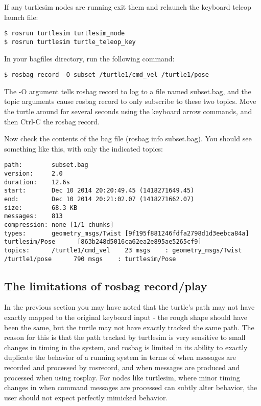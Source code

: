 If any turtlesim nodes are running exit them and relaunch the keyboard teleop launch file:

\begin{lstlisting}[breaklines=true languages=bash]
$ rosrun turtlesim turtlesim_node
$ rosrun turtlesim turtle_teleop_key
\end{lstlisting}

In your bagfiles directory, run the following command:

\begin{lstlisting}[breaklines=true languages=bash]
$ rosbag record -O subset /turtle1/cmd_vel /turtle1/pose
\end{lstlisting}

The -O argument tells rosbag record to log to a file named subset.bag, and the topic arguments cause rosbag record to only subscribe to these two topics. Move the turtle around for several seconds using the keyboard arrow commands, and then Ctrl-C the rosbag record.

Now check the contents of the bag file (rosbag info subset.bag). You should see something like this, with only the indicated topics:

\begin{lstlisting}[breaklines=true languages=bash]
path:        subset.bag
version:     2.0
duration:    12.6s
start:       Dec 10 2014 20:20:49.45 (1418271649.45)
end:         Dec 10 2014 20:21:02.07 (1418271662.07)
size:        68.3 KB
messages:    813
compression: none [1/1 chunks]
types:       geometry_msgs/Twist [9f195f881246fdfa2798d1d3eebca84a]
turtlesim/Pose      [863b248d5016ca62ea2e895ae5265cf9]
topics:      /turtle1/cmd_vel    23 msgs    : geometry_msgs/Twist
/turtle1/pose      790 msgs    : turtlesim/Pose
\end{lstlisting}

\subsection{The limitations of rosbag record/play}

In the previous section you may have noted that the turtle's path may not have exactly mapped to the original keyboard input - the rough shape should have been the same, but the turtle may not have exactly tracked the same path. The reason for this is that the path tracked by turtlesim is very sensitive to small changes in timing in the system, and rosbag is limited in its ability to exactly duplicate the behavior of a running system in terms of when messages are recorded and processed by rosrecord, and when messages are produced and processed when using rosplay. For nodes like turtlesim, where minor timing changes in when command messages are processed can subtly alter behavior, the user should not expect perfectly mimicked behavior.




